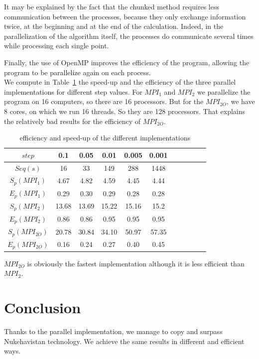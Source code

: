 \documentclass[11pt,a4paper]{article}
\begin{document}
It may be explained by the fact that the chunked method requires less communication between the processes, because they only exchange information twice, at the beginning and at the end of the calculation. Indeed, in the parallelization of the algorithm itself, the processes do communicate several times while processing each single point. 

Finally, the use of OpenMP improves the efficiency of the program, allowing the program to be parallelize again on each process. \\

We compute in Table~\ref{table:efficiency} the speed-up and the efficiency of the three parallel implementations for different step values. For $MPI_1$ and $MPI_2$ we parallelize the program on 16 computers, so there are 16 processors. But for the $MPI_{2O}$, we have 8 cores, on which we run 16 threads. So they are 128 processors. That explains the relatively bad results for the efficiency of $MPI_{2O}$. 

\begin{table}[h]
\centering
\begin{tabular}{|c|c|c|c|c|c|c|c|c|c|c|}
  \hline
  $step$ & 0.1 & 0.05 & 0.01 & 0.005 & 0.001\\ 
  \hline
  $Seq(s)$ & 16 & 33 & 149 & 288 & 1448\\
  \hline
   $S_p(MPI_1)$ & 4.67 & 4.82 & 4.59 & 4.45 & 4.44\\
  \hline
  $E_p(MPI_1)$ & 0.29 & 0.30 & 0.29 & 0.28 & 0.28\\
  \hline
   $S_p(MPI_2)$ & 13.68 & 13.69 & 15.22 & 15.16 & 15.2\\
  \hline
  $E_p(MPI_2)$ & 0.86 & 0.86 & 0.95 & 0.95 & 0.95\\
  \hline
   $S_p(MPI_{2O})$ & 20.78 & 30.84 & 34.10 & 50.97 & 57.35\\
  \hline
  $E_p(MPI_{2O})$ & 0.16 & 0.24 & 0.27 & 0.40 & 0.45\\
  \hline
  \end{tabular}
\caption{\label{table:efficiency} efficiency and speed-up of the different implementations}
\end{table}

$MPI_{2O}$ is obviously the fastest implementation although it is less efficient than $MPI_2$.

\section{Conclusion}
Thanks to the parallel implementation, we manage to copy and surpass Nukehavistan technology. We achieve the same results in different and efficient ways.
\end{document}
